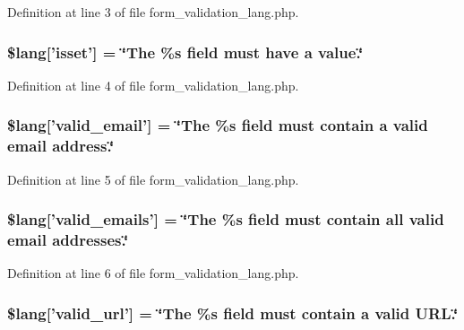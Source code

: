 Definition at line 3 of file form\-\_\-validation\-\_\-lang.\-php.

\hypertarget{form__validation__lang_8php_a7fcb906106dda1aee23bf5bc22024354}{
\subsubsection[{\$lang}]{\setlength{\rightskip}{0pt plus 5cm}\$lang\mbox{[}'isset'\mbox{]} = \char`\"{}The \%s field must have {\bf a} value.\char`\"{}}}\label{form__validation__lang_8php_a7fcb906106dda1aee23bf5bc22024354}


Definition at line 4 of file form\-\_\-validation\-\_\-lang.\-php.

\hypertarget{form__validation__lang_8php_ac65b0427695080708e293f1bd469a94d}{
\subsubsection[{\$lang}]{\setlength{\rightskip}{0pt plus 5cm}\$lang\mbox{[}'valid\-\_\-email'\mbox{]} = \char`\"{}The \%s field must contain {\bf a} valid email address.\char`\"{}}}\label{form__validation__lang_8php_ac65b0427695080708e293f1bd469a94d}


Definition at line 5 of file form\-\_\-validation\-\_\-lang.\-php.

\hypertarget{form__validation__lang_8php_abf35f5d2105406bc8c673a40b31388ba}{
\subsubsection[{\$lang}]{\setlength{\rightskip}{0pt plus 5cm}\$lang\mbox{[}'valid\-\_\-emails'\mbox{]} = \char`\"{}The \%s field must contain all valid email addresses.\char`\"{}}}\label{form__validation__lang_8php_abf35f5d2105406bc8c673a40b31388ba}


Definition at line 6 of file form\-\_\-validation\-\_\-lang.\-php.

\hypertarget{form__validation__lang_8php_ad972568b7943f130b6b241a6b31d455b}{
\subsubsection[{\$lang}]{\setlength{\rightskip}{0pt plus 5cm}\$lang\mbox{[}'valid\-\_\-url'\mbox{]} = \char`\"{}The \%s field must contain {\bf a} valid U\-R\-L.\char`\"{}}}\label{form__validation__lang_8php_ad972568b7943f130b6b241a6b31d455b}


